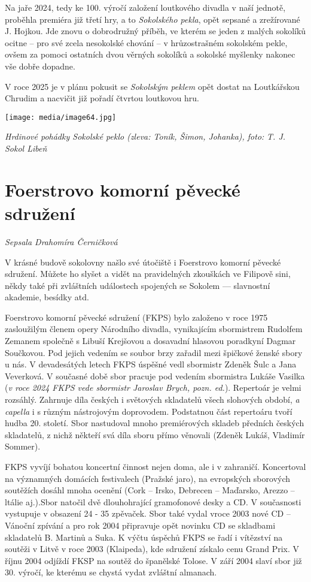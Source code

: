 Na jaře 2024, tedy ke 100. výročí založení loutkového divadla v naší
jednotě, proběhla premiéra již třetí hry, a to \emph{Sokolského pekla},
opět sepsané a zrežírované J. Hojkou. Jde znovu o dobrodružný příběh, ve
kterém se jeden z malých sokolíků ocitne -- pro své zcela nesokolské
chování -- v hrůzostrašném sokolském pekle, ovšem za pomoci ostatních
dvou věrných sokolíků a sokolské myšlenky nakonec vše dobře dopadne.

V roce 2025 je v plánu pokusit se \emph{Sokolským peklem} opět dostat na
Loutkářskou Chrudim a nacvičit již pořadí čtvrtou loutkovou hru.

\texttt{[image: media/image64.jpg]}

\emph{Hrdinové pohádky Sokolské peklo (zleva: Toník, Šimon, Johanka),
foto:} \emph{T. J. Sokol Libeň}

\section{Foerstrovo komorní pěvecké
sdružení}\label{foerstrovo-komornuxed-pux11bveckuxe9-sdruux17eenuxed}

\emph{Sepsala Drahomíra Černičková}

V krásné budově sokolovny našlo své útočiště i Foerstrovo komorní
pěvecké sdružení. Můžete ho slyšet a vidět na pravidelných zkouškách ve
Filipově sini, někdy také při zvláštních událostech spojených se Sokolem
--- slavnostní akademie, besídky atd.

Foerstrovo komorní pěvecké sdružení (FKPS) bylo založeno v roce 1975
zasloužilým členem opery Národního divadla, vynikajícím sbormistrem
Rudolfem Zemanem společně s Libuší Krejšovou a dosavadní hlasovou
poradkyní Dagmar Součkovou. Pod jejich vedením se soubor brzy zařadil
mezi špičkové ženské sbory u nás. V devadesátých letech FKPS úspěšné
vedl sbormistr Zdeněk Šulc a Jana Veverková. V současné době sbor
pracuje pod vedením sbormistra Lukáše Vasilka (\emph{v roce 2024 FKPS
vede sbormistr Jaroslav Brych, pozn. ed.}). Repertoár je velmi rozsáhlý.
Zahrnuje díla českých i světových skladatelů všech slohových období,
\emph{a capella} i s různým nástrojovým doprovodem. Podstatnou část
repertoáru tvoří hudba 20. století. Sbor nastudoval mnoho premiérových
skladeb předních českých skladatelů, z nichž někteří svá díla sboru
přímo věnovali (Zdeněk Lukáš, Vladimír Sommer).

FKPS vyvíjí bohatou koncertní činnost nejen doma, ale i v zahraničí.
Koncertoval na významných domácích festivalech (Pražské jaro), na
evropských sborových soutěžích dosáhl mnoha ocenění (Cork -- Irsko,
Debrecen -- Maďarsko, Arezzo -- ltálie aj.).Sbor natočil dvě
dlouhohrající gramofonové desky a CD. V současnosti vystupuje v obsazení
24 - 35 zpěvaček. Sbor také vydal vroce 2003 nové CD -- Vánoční zpívání
a pro rok 2004 připravuje opět novinku CD se skladbami skladatelů B.
Martinů a Suka. K výčtu úspěchů FKPS se řadí i vítězství na soutěži v
Litvě v roce 2003 (Klaipeda), kde sdružení získalo cenu Grand Prix. V
říjnu 2004 odjíždí FKSP na soutěž do španělské Tolose. V září 2004 slaví
sbor již 30. výročí, ke kterému se chystá vydat zvláštní almanach.


